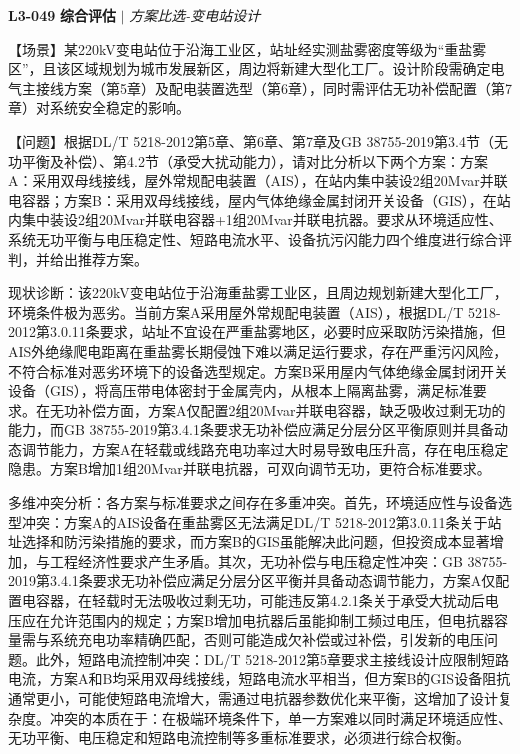 \documentclass[11pt,a4paper]{ctexart}
\begin{document}
\noindent\textbf{L3-049} \hfill \textbf{综合评估} $|$ \textit{方案比选-变电站设计}
\begin{description}[leftmargin=1.5em,style=nextline,font=\normalfont]
  \item[Q:] 【场景】某220kV变电站位于沿海工业区，站址经实测盐雾密度等级为“重盐雾区”，且该区域规划为城市发展新区，周边将新建大型化工厂。设计阶段需确定电气主接线方案（第5章）及配电装置选型（第6章），同时需评估无功补偿配置（第7章）对系统安全稳定的影响。

【问题】根据DL/T 5218-2012第5章、第6章、第7章及GB 38755-2019第3.4节（无功平衡及补偿）、第4.2节（承受大扰动能力），请对比分析以下两个方案：方案A：采用双母线接线，屋外常规配电装置（AIS），在站内集中装设2组20Mvar并联电容器；方案B：采用双母线接线，屋内气体绝缘金属封闭开关设备（GIS），在站内集中装设2组20Mvar并联电容器+1组20Mvar并联电抗器。要求从环境适应性、系统无功平衡与电压稳定性、短路电流水平、设备抗污闪能力四个维度进行综合评判，并给出推荐方案。
  \item[A:] 现状诊断：该220kV变电站位于沿海重盐雾工业区，且周边规划新建大型化工厂，环境条件极为恶劣。当前方案A采用屋外常规配电装置（AIS），根据DL/T 5218-2012第3.0.11条要求，站址不宜设在严重盐雾地区，必要时应采取防污染措施，但AIS外绝缘爬电距离在重盐雾长期侵蚀下难以满足运行要求，存在严重污闪风险，不符合标准对恶劣环境下的设备选型规定。方案B采用屋内气体绝缘金属封闭开关设备（GIS），将高压带电体密封于金属壳内，从根本上隔离盐雾，满足标准要求。在无功补偿方面，方案A仅配置2组20Mvar并联电容器，缺乏吸收过剩无功的能力，而GB 38755-2019第3.4.1条要求无功补偿应满足分层分区平衡原则并具备动态调节能力，方案A在轻载或线路充电功率过大时易导致电压升高，存在电压稳定隐患。方案B增加1组20Mvar并联电抗器，可双向调节无功，更符合标准要求。

多维冲突分析：各方案与标准要求之间存在多重冲突。首先，环境适应性与设备选型冲突：方案A的AIS设备在重盐雾区无法满足DL/T 5218-2012第3.0.11条关于站址选择和防污染措施的要求，而方案B的GIS虽能解决此问题，但投资成本显著增加，与工程经济性要求产生矛盾。其次，无功补偿与电压稳定性冲突：GB 38755-2019第3.4.1条要求无功补偿应满足分层分区平衡并具备动态调节能力，方案A仅配置电容器，在轻载时无法吸收过剩无功，可能违反第4.2.1条关于承受大扰动后电压应在允许范围内的规定；方案B增加电抗器后虽能抑制工频过电压，但电抗器容量需与系统充电功率精确匹配，否则可能造成欠补偿或过补偿，引发新的电压问题。此外，短路电流控制冲突：DL/T 5218-2012第5章要求主接线设计应限制短路电流，方案A和B均采用双母线接线，短路电流水平相当，但方案B的GIS设备阻抗通常更小，可能使短路电流增大，需通过电抗器参数优化来平衡，这增加了设计复杂度。冲突的本质在于：在极端环境条件下，单一方案难以同时满足环境适应性、无功平衡、电压稳定和短路电流控制等多重标准要求，必须进行综合权衡。


\end{description}
\end{document}
